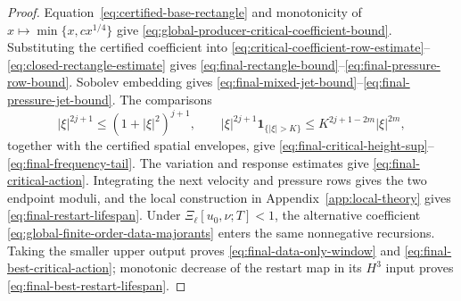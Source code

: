 \begin{proof}
Equation~\eqref{eq:certified-base-rectangle} and monotonicity of
\(x\mapsto\min\{x,cx^{1/4}\}\) give
\eqref{eq:global-producer-critical-coefficient-bound}.  Substituting the
certified coefficient into
\eqref{eq:critical-coefficient-row-estimate}--\eqref{eq:closed-rectangle-estimate}
gives \eqref{eq:final-rectangle-bound}--\eqref{eq:final-pressure-row-bound}.
Sobolev embedding gives
\eqref{eq:final-mixed-jet-bound}--\eqref{eq:final-pressure-jet-bound}.
The comparisons
\[
 |\xi|^{2j+1}\le(1+|\xi|^2)^{j+1},
 \qquad
 |\xi|^{2j+1}\mathbf1_{\{|\xi|>K\}}
 \le K^{2j+1-2m}|\xi|^{2m},
\]
together with the certified spatial envelopes, give
\eqref{eq:final-critical-height-sup}--\eqref{eq:final-frequency-tail}.
The variation and response estimates give
\eqref{eq:final-critical-action}.  Integrating the next velocity and pressure
rows gives the two endpoint moduli, and the local construction in
Appendix~\ref{app:local-theory} gives
\eqref{eq:final-restart-lifespan}.  Under
\(\Xi_\ell[u_0,\nu;T]<1\), the alternative coefficient
\eqref{eq:global-finite-order-data-majorants} enters the same nonnegative
recursions.  Taking the smaller upper output proves
\eqref{eq:final-data-only-window} and
\eqref{eq:final-best-critical-action}; monotonic decrease of the restart map
in its \(H^3\) input proves \eqref{eq:final-best-restart-lifespan}.
\end{proof}
